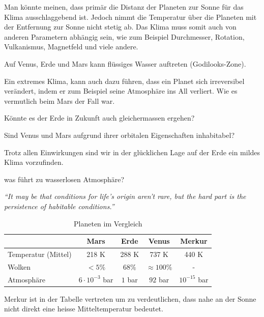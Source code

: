 \begin{refsection}
Man könnte meinen, dass primär die Distanz der Planeten zur Sonne für das  Klima ausschlaggebend ist. Jedoch nimmt die Temperatur über die Planeten mit der Entfernung zur Sonne nicht stetig ab. Das Klima muss somit auch von anderen Parametern abhängig sein, wie zum Beispiel Durchmesser, Rotation, Vulkanismus, Magnetfeld und viele andere.

Auf Venus, Erde und Mars kann flüssiges Wasser auftreten (Godilooks-Zone).

Ein extremes Klima, kann auch dazu führen, dass ein Planet sich irreversibel verändert, indem er zum Beispiel seine Atmosphäre ins All verliert. Wie es vermutlich beim Mars der Fall war.

Könnte es der Erde in Zukunft auch gleichermassen ergehen?

Sind Venus und Mars aufgrund ihrer orbitalen Eigenschaften inhabitabel?

Trotz allen Einwirkungen sind wir in der glücklichen Lage auf der Erde ein mildes Klima vorzufinden. 

was führt zu wasserlosen Atmosphäre?

\vspace{5pt}
\textit{“It may be that conditions for life’s origin aren’t rare, but the hard part is the persistence of habitable conditions.”} \\
\vspace{5pt}


\begin{center}
\begin{table}
	\center
	\begin{tabular}{l|c c c c}
                      & Mars    & Erde   & Venus           & Merkur\\
  \hline
  Temperatur (Mittel) & 218 K   & 288 K  & 737 K           & 440 K\\
  Wolken              & $<5\%$ & $68\%$ & $\approx100\%$ & - \\
  Atmosphäre          & $6 \cdot 10^{-3}$ bar & $1$ bar & $92$ bar & $10^{-15}$ bar
	
\end{tabular}
\caption{Planeten im Vergleich}
\end{table}

\end{center}

Merkur ist in der Tabelle vertreten um zu verdeutlichen, dass nahe an der Sonne nicht direkt eine heisse Mitteltemperatur bedeutet.


\end{refsection}
